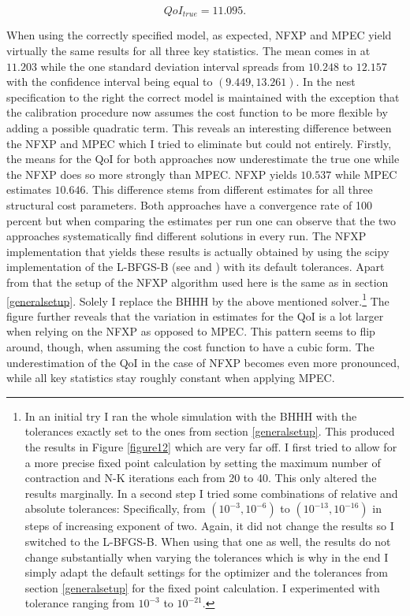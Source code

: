 \begin{equation*}
	QoI_{true} = 11.095.
\end{equation*}

When using the correctly specified model, as expected, NFXP and MPEC yield virtually the same results for all three key statistics. The mean comes in at $11.203$ while the one standard deviation interval spreads from $10.248$ to $12.157$ with the confidence interval being equal to $(9.449, 13.261)$. In the nest specification to the right the correct model is maintained with the exception that the calibration procedure now assumes the cost function to be more flexible by adding a possible quadratic term. This reveals an interesting difference between the NFXP and MPEC which I tried to eliminate but could not entirely. Firstly, the means for the QoI for both approaches now underestimate the true one while the NFXP does so more strongly than MPEC. NFXP yields $10.537$ while MPEC estimates $10.646$. This difference stems from different estimates for all three structural cost parameters. Both approaches have a convergence rate of 100 percent but when comparing the estimates per run one can observe that the two approaches systematically find different solutions in every run. The NFXP implementation that yields these results is actually obtained by using the scipy implementation of the L-BFGS-B (see \cite{Byrd.1997} and \cite{scipy.2020}) with its default tolerances. Apart from that the setup of the NFXP algorithm used here is the same as in section \ref{generalsetup}. Solely I replace the BHHH by the above mentioned solver.\footnote{ In an initial try I ran the whole simulation with the BHHH with the tolerances exactly set to the ones from section \ref{generalsetup}. This produced the results in Figure \ref{figure12} which are very far off. I first tried to allow for a more precise fixed point calculation by setting the maximum number of contraction and N-K iterations each from 20 to 40. This only altered the results marginally. In a second step I tried some combinations of relative and absolute tolerances: Specifically, from $(10^{-3}, 10^{-6})$ to $(10^{-13}, 10^{-16})$ in steps of increasing exponent of two. Again, it did not change the results so I switched to the L-BFGS-B. When using that one as well, the results do not change substantially when varying the tolerances which is why in the end I simply adapt the default settings for the optimizer and the tolerances from section \ref{generalsetup} for the fixed point calculation. I experimented with tolerance ranging from $10^{-3}$ to $10^{-21}$.} The figure further reveals that the variation in estimates for the QoI is a lot larger when relying on the NFXP as opposed to MPEC. This pattern seems to flip around, though, when assuming the cost function to have a cubic form. The underestimation of the QoI in the case of NFXP becomes even more pronounced, while all key statistics stay roughly constant when applying MPEC.

